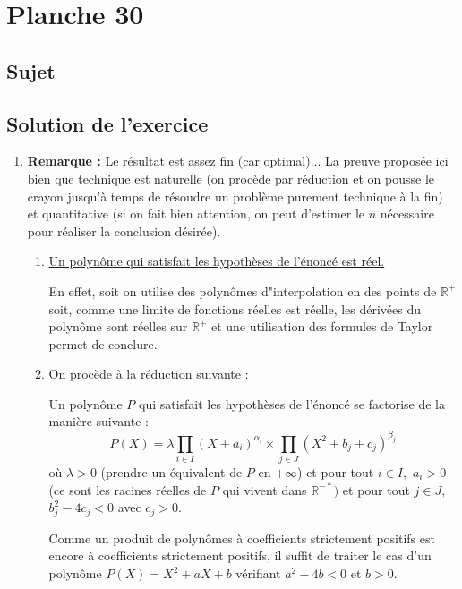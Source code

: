  \chapter{Planche 30}

\section{Sujet}

\section{Solution de l'exercice}
 
 \begin{enumerate}
 
\item \textbf{Remarque :} Le résultat est assez fin (car optimal)... La preuve proposée ici bien que technique est naturelle (on procède par réduction et on pousse le crayon jusqu'à temps de résoudre un problème purement technique à la fin) et quantitative (si on fait bien attention, on peut d'estimer le $n$ nécessaire pour réaliser la conclusion désirée).\\

\begin{enumerate}
\item \underline{Un polynôme qui satisfait les hypothèses de l'énoncé est réel.}
    
En effet, soit on utilise des polynômes d"interpolation en des points de $\mathbb{R}^{+}$ soit, comme une limite de fonctions réelles est réelle, les dérivées du polynôme sont réelles sur $\mathbb{R}^{+}$ et une utilisation des formules de Taylor permet de conclure.

\item \underline{On procède à la réduction suivante :}

Un polynôme $P$ qui satisfait les hypothèses de l'énoncé se factorise de la  manière suivante : 
$$P(X)=\lambda\prod_{i\in I}(X+a_{i})^{\alpha_{i}}\times \prod_{j\in J}(X^{2}+b_{j}+c_{j})^{\beta_{j}}$$ 
où $\lambda>0$ (prendre un équivalent de $P$ en $+\infty$) et pour tout $i\in I,$ $a_{i}>0$ (ce sont les racines réelles de $P$ qui vivent dans $\mathbb{R}^{-*})$ et pour tout $j\in J,$ $b_{j}^{2}-4c_{j}<0$ avec $c_{j}>0.$

Comme un produit de polynômes à coefficients strictement positifs est encore à coefficients strictement positifs, il suffit de traiter le cas d'un polynôme $P(X)=X^{2}+aX+b$ vérifiant $a^{2}-4b<0$ et $b>0.$


\end{enumerate}
\end{enumerate}
